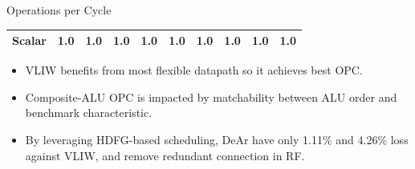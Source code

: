 \documentclass{beamer}
\begin{document}
\begin{CJK}{UTF8}{bkai}
\begin{frame}{Operations per Cycle}
\begin{table}[!ht]
{\begin{tabular}{|c|c|c|c|c|c|c|c|c|c|}
                            Scalar  & 1.0  & 1.0  & 1.0  & 1.0  & 1.0  & 1.0  & 1.0  & 1.0  & 1.0 \\ \hline 
                        \end{tabular}
                    }
                \end{table}
                \begin{itemize}
                    \item <2->{VLIW benefits from most flexible datapath so it achieves best OPC.}
                    \item <3->{Composite-ALU OPC is impacted by matchability between ALU order and benchmark characteristic.}
                    \item <4->{By leveraging HDFG-based scheduling, DeAr have only 1.11\% and 4.26\% loss against VLIW,
                        and remove redundant connection in RF.}
                \end{itemize}

            \end{frame}


\end{CJK}
\end{document}
